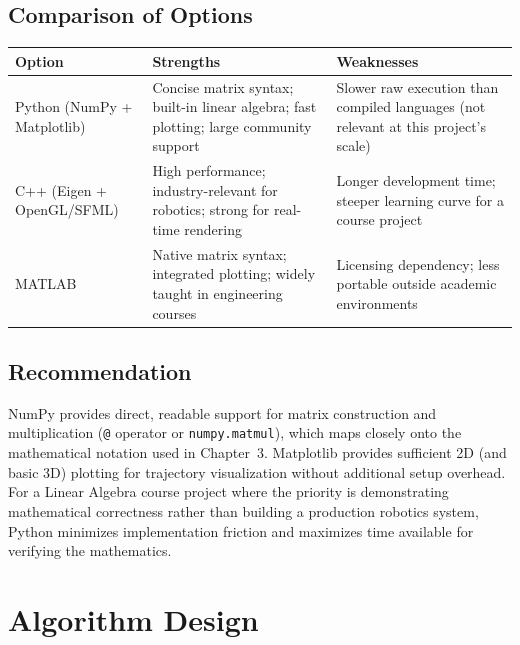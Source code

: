 \documentclass[12pt]{report}
\begin{document}
\section{Comparison of Options}
\begin{center}
\begin{tabular}{>{\raggedright\arraybackslash}p{3.4cm}>{\raggedright\arraybackslash}p{4.1cm}>{\raggedright\arraybackslash}p{4.1cm}}
\toprule
\rowcolor{HULight}
\textbf{\color{HUPurple}Option} & \textbf{\color{HUPurple}Strengths} & \textbf{\color{HUPurple}Weaknesses} \\
\midrule
Python (NumPy + Matplotlib) & Concise matrix syntax; built-in linear algebra; fast plotting; large community support & Slower raw execution than compiled languages (not relevant at this project's scale) \\
\addlinespace
C++ (Eigen + OpenGL/SFML) & High performance; industry-relevant for robotics; strong for real-time rendering & Longer development time; steeper learning curve for a course project \\
\addlinespace
MATLAB & Native matrix syntax; integrated plotting; widely taught in engineering courses & Licensing dependency; less portable outside academic environments \\
\bottomrule
\end{tabular}
\end{center}

\section{Recommendation}
\begin{infobox}[title=Recommended: Python with NumPy and Matplotlib]
NumPy provides direct, readable support for matrix construction and multiplication (\texttt{@} operator or \texttt{numpy.matmul}), which maps closely onto the mathematical notation used in Chapter~3. Matplotlib provides sufficient 2D (and basic 3D) plotting for trajectory visualization without additional setup overhead. For a Linear Algebra course project where the priority is demonstrating mathematical correctness rather than building a production robotics system, Python minimizes implementation friction and maximizes time available for verifying the mathematics.
\end{infobox}

\chapter{Algorithm Design}
\end{document}
